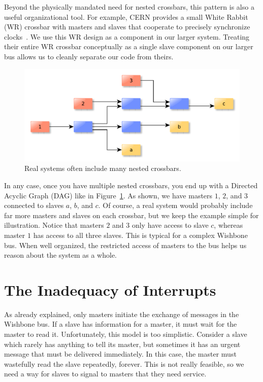 \documentclass[a4paper]{jacow}
\begin{document}
Beyond the physically mandated need for nested crossbars,
this pattern is also a useful organizational tool.
For example, CERN provides a small White Rabbit (WR) crossbar with masters
and slaves that cooperate to precisely synchronize clocks~\cite{wr}.
We use this WR design as a component in our larger system.
Treating their entire WR crossbar conceptually as a single slave component on
our larger bus allows us to cleanly separate our code from theirs.

\begin{figure}[t]
  \centering
  \includegraphics*[width=\columnwidth]{complex-bus}
  \caption{Real systems often include many nested crossbars.}
  \label{fig:complex-bus}
\end{figure}

In any case, once you have multiple nested crossbars, you end up with a
Directed Acyclic Graph (DAG) like in Figure~\ref{fig:complex-bus}.
As shown, we have masters $1$, $2$, and $3$ connected to slaves $a$, $b$, and $c$.
Of course, a real system would probably include far more masters and slaves on each
crossbar, but we keep the example simple for illustration.
Notice that masters $2$ and $3$ only have access to slave $c$,
whereas master $1$ has access to all three slaves.
This is typical for a complex Wishbone bus.
When well organized, the restricted access of masters to the bus helps
us reason about the system as a whole.

\section{The Inadequacy of Interrupts}

As already explained,
only masters initiate the exchange of messages in the Wishbone bus.
If a slave has information for a master, it must wait for the master to read it.
Unfortunately, this model is too simplistic.
Consider a slave which rarely has anything to tell its master,
but sometimes it has an urgent message that must be delivered immediately.
In this case, the master must wastefully read the slave repeatedly, forever.
This is not really feasible, so we need a way for slaves to signal to
masters that they need service.
\end{document}
